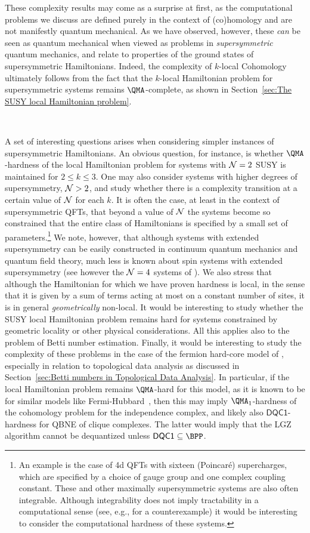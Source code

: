 \documentclass[11pt]{article}
\numberwithin{equation}{section}
\def\cN{{\cal N}}
\newcommand{\DQC}{\mathsf{DQC1}}
\renewcommand\( {\left(}
\renewcommand\) {\right)}
\begin{document}
These complexity results may come as a surprise at first, as the computational problems we discuss are defined purely in the context of (co)homology and are not manifestly quantum mechanical. As we have observed, however, these {\it can} be seen as quantum mechanical when viewed  as problems in {\it supersymmetric} quantum mechanics, and relate to properties of the ground states of supersymmetric Hamiltonians. Indeed, the complexity of {\sc $k$-local Cohomology} ultimately follows from the fact that the $k$-local Hamiltonian problem for supersymmetric systems remains $\QMA$-complete, as shown in Section~\ref{sec:The SUSY local Hamiltonian problem}.

\ 


A set of interesting questions arises when considering simpler instances of supersymmetric Hamiltonians. An obvious question, for instance, is whether $\QMA$-hardness of the local  Hamiltonian problem for systems with $\cN=2$ SUSY is maintained for $2\leq k\leq3$. One may also consider systems with higher degrees of supersymmetry, $\cN>2$, and study whether there is a complexity transition at a certain value of $\cN$ for each $k$. It is often the case, at least in the context of supersymmetric QFTs, that beyond a value of $\cN$ the systems become so constrained that the entire class of Hamiltonians is specified by a small set of parameters.\footnote{An example is the case of 4d QFTs with sixteen (Poincar\'e) supercharges, which are specified by a choice of gauge group and one complex coupling constant. These and other maximally supersymmetric systems are also often integrable. Although integrability does not imply tractability in a computational sense (see, e.g., \cite{aaronson2016computational} for a counterexample) it would be interesting to consider the computational hardness of these systems. } 
We note, however, that although systems with extended supersymmetry can be easily constructed in continuum quantum mechanics and quantum field theory,  much less is known about spin systems with extended supersymmetry (see however the $\cN=4$ systems of \cite{2005JPhA...38.5425S}). 
We also stress that although the Hamiltonian for which we have proven hardness is local, in the sense that it is given by a sum of terms acting at most on a constant number of sites, it is in general {\it geometrically} non-local.
It would be interesting to study whether the  SUSY local Hamiltonian problem remains hard for systems constrained by geometric locality or other physical considerations. 
All this applies also to the problem of Betti number estimation. Finally, it would be interesting to study the complexity of these problems in the case of the fermion hard-core model of \cite{Fendley:2002sg}, especially in relation to topological data analysis  as discussed in Section~\ref{sec:Betti numbers in Topological Data Analysis}. In particular, if the local Hamiltonian problem remains $\QMA$-hard for this model, as it is known to be for similar models like Fermi-Hubbard~\cite{o2021electronic}, then this may imply $\QMA_1$-hardness of the cohomology problem for the independence complex, and likely also $\DQC$-hardness for QBNE of clique complexes. The latter would imply that the LGZ algorithm cannot be dequantized unless $\DQC \subseteq \BPP$.
\end{document}
